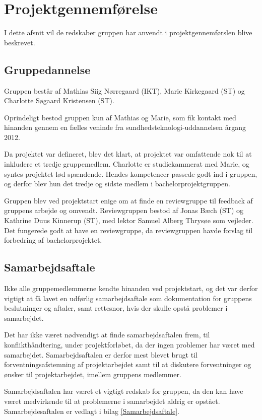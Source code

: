 \chapter{Projektgennemførelse}\label{kapitel_Projektgennemforelse}
I dette afsnit vil de redskaber gruppen har anvendt i projektgennemførslen blive beskrevet. 

\section{Gruppedannelse}
Gruppen består af Mathias Siig Nørregaard (IKT), Marie Kirkegaard (ST) og Charlotte Søgaard Kristensen (ST). 

Oprindeligt bestod gruppen kun af Mathias og Marie, som fik kontakt med hinanden gennem en fælles veninde fra sundhedsteknologi-uddannelsen årgang 2012.

Da projektet var defineret, blev det klart, at  projektet var omfattende nok til at inkludere et tredje gruppemedlem. Charlotte er studiekammerat med Marie, og syntes projektet lød spændende. Hendes kompetencer passede godt ind i gruppen, og derfor blev hun det tredje og sidste medlem i bachelorprojektgruppen. 

Gruppen blev ved projektstart enige om at finde en reviewgruppe til feedback af gruppens arbejde og omvendt. Reviewgruppen bestod af Jonas Bæch (ST) og Kathrine Duus Kinnerup (ST), med lektor Samuel Alberg Thrysøe som vejleder. Det fungerede godt at have en reviewgruppe, da reviewgruppen havde forslag til forbedring af bachelorprojektet.  

\section{Samarbejdsaftale}
Ikke alle gruppemedlemmerne kendte hinanden ved projektstart, og det var derfor vigtigt at få lavet en udførlig samarbejdsaftale som dokumentation for gruppens beslutninger og aftaler, samt rettesnor, hvis der skulle opstå problemer i samarbejdet. 

Det har ikke været nødvendigt at finde samarbejdsaftalen frem, til konflikthåndtering, under projektforløbet, da der ingen problemer har været med samarbejdet. Samarbejdsaftalen er derfor mest blevet brugt til forventningsafstemning af projektarbejdet samt til at diskutere forventninger og ønsker til projektarbejdet, imellem gruppens medlemmer. 

Samarbejdsaftalen har været et vigtigt redskab for gruppen, da den kan have været medvirkende til at problemerne i samarbejdet aldrig er opstået. Samarbejdesaftalen er vedlagt i bilag \ref{Samarbejdsaftale}. 

